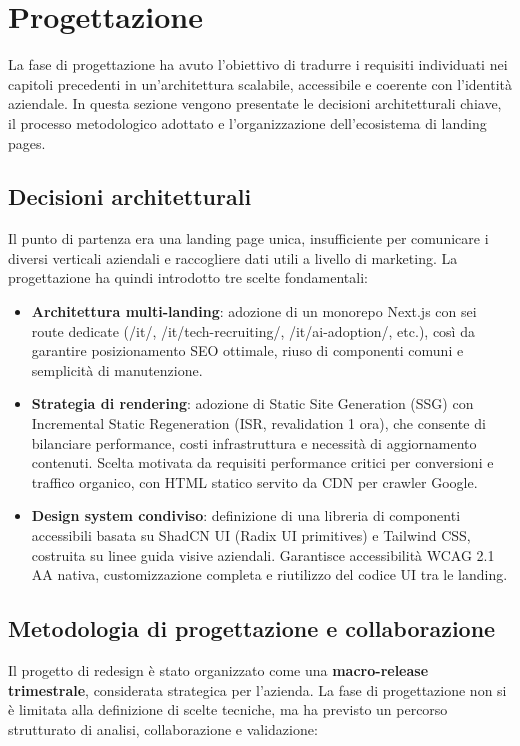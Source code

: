 
\chapter{Progettazione}

La fase di progettazione ha avuto l'obiettivo di tradurre i requisiti individuati
nei capitoli precedenti in un'architettura scalabile, accessibile e coerente con
l'identità aziendale. In questa sezione vengono presentate le decisioni
architetturali chiave, il processo metodologico adottato e l'organizzazione
dell'ecosistema di landing pages.

\section{Decisioni architetturali}
Il punto di partenza era una landing page unica, insufficiente per comunicare i
diversi verticali aziendali e raccogliere dati utili a livello di marketing. La
progettazione ha quindi introdotto tre scelte fondamentali:

\begin{itemize}
  \item \textbf{Architettura multi-landing}: adozione di un monorepo Next.js con sei
  route dedicate (/it/, /it/tech-recruiting/, /it/ai-adoption/, etc.), così da garantire 
  posizionamento SEO ottimale, riuso di componenti comuni e semplicità di manutenzione. 
  
  \item \textbf{Strategia di rendering}: adozione di Static Site Generation (SSG) 
  con Incremental Static Regeneration (ISR, revalidation 1 ora), che consente di 
  bilanciare performance, costi infrastruttura e 
  necessità di aggiornamento contenuti. Scelta motivata da requisiti performance 
  critici per conversioni e traffico organico, con HTML statico servito da CDN 
  per crawler Google.
  
  \item \textbf{Design system condiviso}: definizione di una libreria di componenti 
  accessibili basata su ShadCN UI (Radix UI primitives) e Tailwind CSS, costruita 
  su linee guida visive aziendali. Garantisce accessibilità WCAG 2.1 AA nativa, 
  customizzazione completa e riutilizzo del codice UI tra le landing.
\end{itemize}

\section{Metodologia di progettazione e collaborazione} Il progetto di redesign è stato organizzato come una \textbf{macro-release trimestrale},
considerata strategica per l'azienda. La fase di progettazione non si è limitata
alla definizione di scelte tecniche, ma ha previsto un percorso strutturato di
analisi, collaborazione e validazione:

